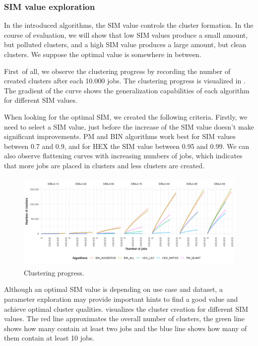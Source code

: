 \documentclass[]{llncs}
\begin{document}
\subsubsection{SIM value exploration}
In the introduced algorithms, the SIM value controls the cluster formation.
In the course of evaluation, we will show that low SIM values produce a small amount, but polluted clusters, and a high SIM value produces a large amount, but clean clusters.
We suppose the optimal value is somewhere in between.

First\ of all, we observe the clustering progress by recording  the number of created clusters after each 10.000 jobs.
The clustering progress is visualized in .
The gradient of the curve shows the generalization capabilities of each algorithm for different SIM values.

When looking for the optimal SIM, we created the following criteria.
Firstly, we need to select a SIM value, just before the increase of the SIM value doesn’t make significant improvements.
PM and BIN algorithms work best for SIM values between 0.7 and 0.9, and for HEX the SIM value between 0.95 and 0.99.
We can also observe flattening curves with increasing numbers of jobs, which indicates that more jobs are placed in clusters and less clusters are created.

\begin{figure}
  \centering
   \includegraphics[width=4.61in,height=1.85in]{./media/image15.png}
   \caption{Clustering progress.}
   \label{fig:clustering_progress}
\end{figure}

Although an optimal SIM value is depending on use case and dataset, a parameter exploration may provide important hints to find a good value and achieve optimal cluster qualities.
 visualizes the cluster creation for different SIM values.
The red line approximates the overall number of clusters, the green line shows how many contain at least two jobs and the blue line shows how many of them contain at least 10 jobs.
\end{document}
